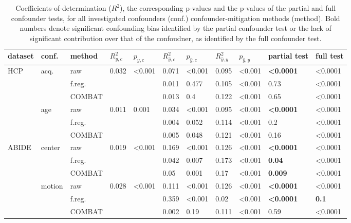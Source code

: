 \documentclass{article}
\begin{document}
\renewcommand{\arraystretch}{1.2}
\begin{table}
\centering
\begin{tabular}{lll|ll|ll|ll|ll} 
dataset & conf. & method & $R^2_{y, c}$ & $p_{y, c}$ & $R^2_{\hat{y}, c}$ & $p_{\hat{y}, c}$ & $R^2_{\hat{y}, y}$ & $p_{\hat{y}, y}$ & partial test & full test  \\
\hline
HCP & acq.  & raw      & 0.032 & <0.001 & 0.071 & <0.001  & 0.095 & <0.001 & \textbf{<0.0001} & <0.0001 \\
    &              & f.reg.    & & & 0.011 & 0.477 & 0.105  & <0.001  & 0.73 & <0.0001 \\
    &              & COMBAT    & & &0.013 & 0.4 & 0.122  & <0.001  & 0.65 & <0.0001\\
\hline
    & age   & raw       & 0.011 & 0.001  & 0.034 & <0.001  & 0.095  & <0.001 & \textbf{<0.0001} & <0.0001 \\
    &       & f.reg.    & & &0.004 & 0.052 & 0.114  & <0.001  & 0.2 & <0.0001 \\
    &       & COMBAT    & & &0.005 & 0.048 & 0.121 & <0.001 & 0.16 & <0.0001 \\
\hline
ABIDE   & center   & raw       & 0.019  & <0.001 &  0.169 & <0.001& 0.126     & <0.001 & \textbf{<0.0001} & <0.0001 \\
        &          & f.reg.    &  & &  0.042 & 0.007 & 0.173     & <0.001 & \textbf{0.04} & <0.0001 \\
        &          & COMBAT    &  & &  0.05 & 0.001 & 0.17     & <0.001 & \textbf{0.009} & <0.0001 \\
\hline
        & motion   & raw       & 0.028 & <0.001 & 0.111    &  <0.001 & 0.126    & <0.001 & \textbf{<0.0001} & <0.0001 \\
        &          & f.reg.    & & & 0.359    & <0.001  & 0.02   & <0.001 & \textbf{<0.0001} & \textbf{0.1} \\
        &          & COMBAT    & & &  0.002 & 0.19 & 0.111     & <0.001 & 0.59 & <0.0001 \\
    

\end{tabular}
\caption{\label{tab:unconditional-pvals} Coefficients-of-determination ($R^2$), the corresponding p-values and the p-values of the partial and full confounder tests, for all investigated confounders (conf.) confounder-mitigation methods (method). Bold numbers denote significant confounding bias identified by the partial confounder test or the lack of significant contribution over that of the confoudner, as identified by the full confounder test.}
\end{table}
\end{document}
